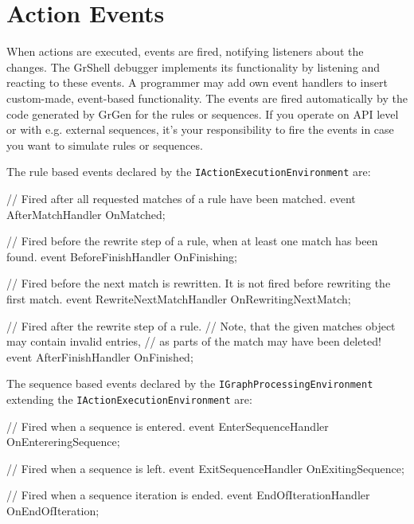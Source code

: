 \section{Action Events}\label{sec:actionevent}

When actions are executed, events are fired, notifying listeners about the changes.
The GrShell debugger implements its functionality by listening and reacting to these events.
A programmer may add own event handlers to insert custom-made, event-based functionality.
The events are fired automatically by the code generated by GrGen for the rules or sequences.
If you operate on API level or with e.g. external sequences, it's your responsibility to fire the events in case you want to simulate rules or sequences.

The rule based events declared by the \texttt{IActionExecutionEnvironment} are:

\begin{csharplet}
// Fired after all requested matches of a rule have been matched.
event AfterMatchHandler OnMatched;

// Fired before the rewrite step of a rule, when at least one match has been found.
event BeforeFinishHandler OnFinishing;

// Fired before the next match is rewritten. It is not fired before rewriting the first match.
event RewriteNextMatchHandler OnRewritingNextMatch;

// Fired after the rewrite step of a rule.
// Note, that the given matches object may contain invalid entries,
// as parts of the match may have been deleted!
event AfterFinishHandler OnFinished;
\end{csharplet}

The sequence based events declared by the \texttt{IGraphProcessingEnvironment} extending the \texttt{IActionExecutionEnvironment} are:
         
\begin{csharplet}
// Fired when a sequence is entered.
event EnterSequenceHandler OnEntereringSequence;

// Fired when a sequence is left.
event ExitSequenceHandler OnExitingSequence;

// Fired when a sequence iteration is ended.
event EndOfIterationHandler OnEndOfIteration;
\end{csharplet}
